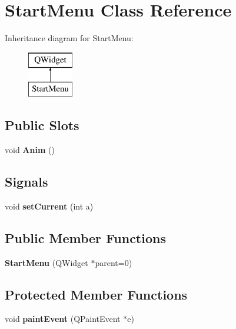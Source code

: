 \hypertarget{class_start_menu}{}\section{Start\+Menu Class Reference}
\label{class_start_menu}
Inheritance diagram for Start\+Menu\+:\begin{figure}[H]
\begin{center}
\leavevmode
\includegraphics[height=2.000000cm]{class_start_menu}
\end{center}
\end{figure}
\subsection*{Public Slots}
\begin{DoxyCompactItemize}
\item 
\hypertarget{class_start_menu_a3454310eae3e51ebfcd00b9837e0cd71}{}void {\bfseries Anim} ()\label{class_start_menu_a3454310eae3e51ebfcd00b9837e0cd71}

\end{DoxyCompactItemize}
\subsection*{Signals}
\begin{DoxyCompactItemize}
\item 
\hypertarget{class_start_menu_a5ec52ec6f45dffd4ded1592b4bb9526f}{}void {\bfseries set\+Current} (int a)\label{class_start_menu_a5ec52ec6f45dffd4ded1592b4bb9526f}

\end{DoxyCompactItemize}
\subsection*{Public Member Functions}
\begin{DoxyCompactItemize}
\item 
\hypertarget{class_start_menu_a1491fb2672b951483f3cfc0594571fbb}{}{\bfseries Start\+Menu} (Q\+Widget $\ast$parent=0)\label{class_start_menu_a1491fb2672b951483f3cfc0594571fbb}

\end{DoxyCompactItemize}
\subsection*{Protected Member Functions}
\begin{DoxyCompactItemize}
\item 
\hypertarget{class_start_menu_a228c407369ced59d196afd48c1660ed1}{}void {\bfseries paint\+Event} (Q\+Paint\+Event $\ast$e)\label{class_start_menu_a228c407369ced59d196afd48c1660ed1}

\end{DoxyCompactItemize}
